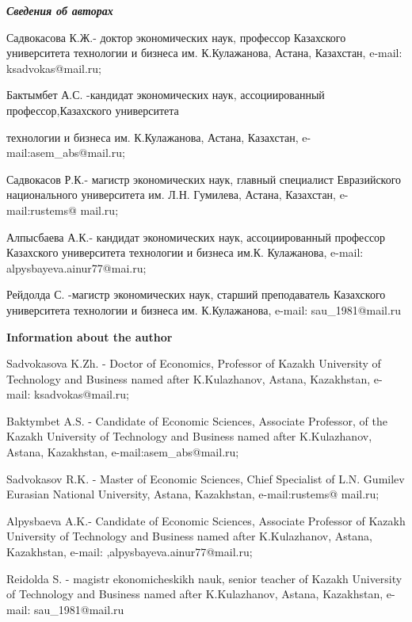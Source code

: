 \emph{{\bfseries Сведения об авторах}}

\begin{noparindent}
Садвокасова К.Ж.- доктор экономических наук, профессор Казахского
университета технологии и бизнеса им. К.Кулажанова, Астана, Казахстан,
e-mail: ksadvokas@mail.ru;

Бактымбет А.С. -кандидат экономических наук, ассоциированный
профессор,Казахского университета

технологии и бизнеса им. К.Кулажанова, Астана, Казахстан,
e-mail:asem\_abs@mail.ru;

Садвокасов Р.К.- магистр экономических наук, главный специалист
Евразийского национального университета им. Л.Н. Гумилева, Астана,
Казахстан, e-mail:rustems@ mail.ru;

Алпысбаева А.К.- кандидат экономических наук, ассоциированный профессор
Казахского университета технологии и бизнеса им.К. Кулажанова, e-mail:
alpysbayeva.ainur77@mai.ru;

Рейдолда С. -магистр экономических наук, старший преподаватель
Казахского университета технологии и бизнеса им. К.Кулажанова, e-mail:
sau\_1981@mail.ru
\end{noparindent}

{\bfseries Information about the author}

\begin{noparindent}
Sadvokasova K.Zh. - Doctor of Economics, Professor of Kazakh University
of Technology and Business named after K.Kulazhanov, Astana, Kazakhstan,
e-mail: ksadvokas@mail.ru;

Baktymbet A.S. - Candidate of Economic Sciences, Associate Professor, of
the Kazakh University of Technology and Business named after
K.Kulazhanov, Astana, Kazakhstan, e-mail:asem\_abs@mail.ru;

Sadvokasov R.K. - Master of Economic Sciences, Chief Specialist of L.N.
Gumilev Eurasian National University, Astana, Kazakhstan,
e-mail:rustems@ mail.ru;

Alpysbaeva A.K.- Candidate of Economic Sciences, Associate Professor of
Kazakh University of Technology and Business named after K.Kulazhanov,
Astana, Kazakhstan, e-mail: ,alpysbayeva.ainur77@mail.ru;

Reidolda S. - magistr ekonomicheskikh nauk, senior teacher of Kazakh
University of Technology and Business named after K.Kulazhanov, Astana,
Kazakhstan, e-mail: sau\_1981@mail.ru
\end{noparindent}
